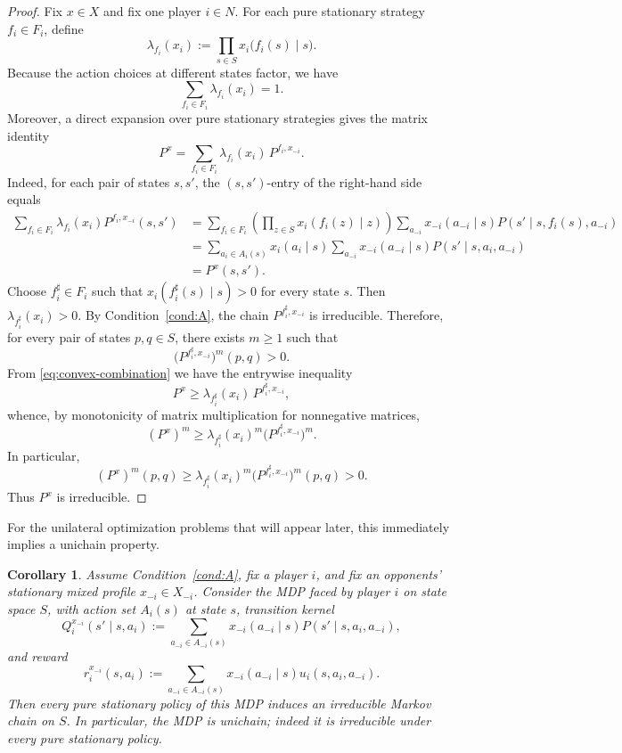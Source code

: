 \documentclass[11pt]{article}
\newtheorem{corollary}[theorem]{Corollary}
\theoremstyle{definition}
\newcommand{\1}{\mathbf{1}}
\begin{document}
\begin{proof}
Fix $x\in X$ and fix one player $i\in N$. For each pure stationary strategy $f_i\in F_i$, define
\[
\lambda_{f_i}(x_i):=\prod_{s\in S}x_i\bigl(f_i(s)\mid s\bigr).
\]
Because the action choices at different states factor, we have
\[
\sum_{f_i\in F_i}\lambda_{f_i}(x_i)=1.
\]
Moreover, a direct expansion over pure stationary strategies gives the matrix identity
\begin{equation}\label{eq:convex-combination}
P^x=\sum_{f_i\in F_i}\lambda_{f_i}(x_i)\,P^{f_i,x_{-i}}.
\end{equation}
Indeed, for each pair of states $s,s'$, the $(s,s')$-entry of the right-hand side equals
\begin{align*}
\sum_{f_i\in F_i}\lambda_{f_i}(x_i)P^{f_i,x_{-i}}(s,s')
&=\sum_{f_i\in F_i}\left(\prod_{z\in S}x_i(f_i(z)\mid z)\right)
\sum_{a_{-i}}x_{-i}(a_{-i}\mid s)P(s'\mid s,f_i(s),a_{-i})\\
&=\sum_{a_i\in A_i(s)}x_i(a_i\mid s)\sum_{a_{-i}}x_{-i}(a_{-i}\mid s)P(s'\mid s,a_i,a_{-i})\\
&=P^x(s,s').
\end{align*}
Choose $f_i^\sharp\in F_i$ such that $x_i(f_i^\sharp(s)\mid s)>0$ for every state $s$. Then $\lambda_{f_i^\sharp}(x_i)>0$. By Condition~\ref{cond:A}, the chain $P^{f_i^\sharp,x_{-i}}$ is irreducible. Therefore, for every pair of states $p,q\in S$, there exists $m\ge1$ such that
\[
\bigl(P^{f_i^\sharp,x_{-i}}\bigr)^m(p,q)>0.
\]
From \eqref{eq:convex-combination} we have the entrywise inequality
\[
P^x\ge \lambda_{f_i^\sharp}(x_i)\,P^{f_i^\sharp,x_{-i}},
\]
whence, by monotonicity of matrix multiplication for nonnegative matrices,
\[
(P^x)^m\ge \lambda_{f_i^\sharp}(x_i)^m\bigl(P^{f_i^\sharp,x_{-i}}\bigr)^m.
\]
In particular,
\[
(P^x)^m(p,q)\ge \lambda_{f_i^\sharp}(x_i)^m\bigl(P^{f_i^\sharp,x_{-i}}\bigr)^m(p,q)>0.
\]
Thus $P^x$ is irreducible.
\end{proof}

For the unilateral optimization problems that will appear later, this immediately implies a unichain property.

\begin{corollary}\label{cor:unichain-from-A}
Assume Condition~\ref{cond:A}, fix a player $i$, and fix an opponents' stationary mixed profile $x_{-i}\in X_{-i}$. Consider the MDP faced by player $i$ on state space $S$, with action set $A_i(s)$ at state $s$, transition kernel
\[
Q_i^{x_{-i}}(s'\mid s,a_i):=\sum_{a_{-i}\in A_{-i}(s)}x_{-i}(a_{-i}\mid s)P(s'\mid s,a_i,a_{-i}),
\]
and reward
\[
r_i^{x_{-i}}(s,a_i):=\sum_{a_{-i}\in A_{-i}(s)}x_{-i}(a_{-i}\mid s)u_i(s,a_i,a_{-i}).
\]
Then every pure stationary policy of this MDP induces an irreducible Markov chain on $S$. In particular, the MDP is unichain; indeed it is irreducible under every pure stationary policy.
\end{corollary}
\end{document}
